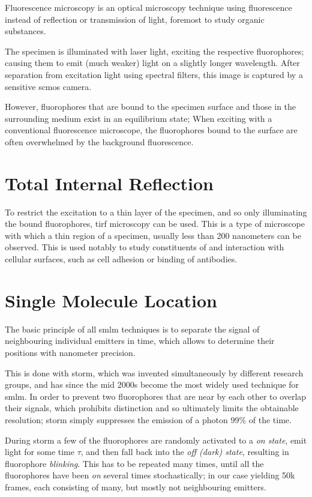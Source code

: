 \documentclass[11pt, a4paper, oneside, twocolumn]{report}
\newcommand{\e}{\emph}
\newcommand{\x}[1]{#1\index{#1}}
\begin{document}
Fluorescence microscopy is an optical microscopy technique using
fluorescence instead of reflection or transmission of light, foremost
to study organic substances.

The specimen is illuminated with laser light, exciting the respective
\x{fluorophores}; causing them to emit (much weaker) light on a
slightly longer wavelength. After separation from excitation light
using spectral filters, this image is captured by a sensitive
\gls{scmos} camera.

However, fluorophores that are bound to the specimen surface and those
in the surrounding medium exist in an equilibrium state; When exciting
with a conventional fluorescence microscope, the fluorophores bound to
the surface are often overwhelmed by the background fluorescence.


\section{Total Internal Reflection}

To restrict the excitation to a thin layer of the specimen, and so
only illuminating the bound fluorophores, \gls{tirf} microscopy can be
used. This is a type of microscope with which a thin region of a
specimen, usually less than 200 nanometers can be observed. This is
used notably to study constituents of and interaction with cellular
surfaces, such as cell adhesion or binding of antibodies.


\section{Single Molecule Location}

The basic principle of all \gls{smlm} techniques is to separate the
signal of neighbouring individual emitters in time, which allows to
determine their positions with nanometer precision.

This is done with \gls{storm}, which was invented simultaneously by
different research groups, and has since the mid 2000s become the most
widely used technique for \gls{smlm}. In order to prevent two
fluorophores that are near by each other to overlap their signals,
which prohibits distinction and so ultimately limits the obtainable
resolution; \gls{storm} simply suppresses the emission of a photon
99\% of the time.

During \gls{storm} a few of the fluorophores are randomly activated to
a \e{on state}, emit light for some time $\tau$, and then fall back
into the \e{off (dark) state}, resulting in fluorophore
\e{blinking}. This has to be repeated many times, until all the
fluorophores have been \e{on} several times stochastically; in our
case yielding 50k frames, each consisting of many, but mostly not
neighbouring emitters.
\end{document}
